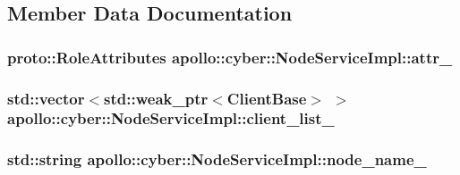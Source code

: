 \subsection{Member Data Documentation}
\hypertarget{classapollo_1_1cyber_1_1NodeServiceImpl_a762c2be3d310b7af1c0da1b83df54349}{
\subsubsection[{attr\-\_\-}]{\setlength{\rightskip}{0pt plus 5cm}proto\-::\-Role\-Attributes apollo\-::cyber\-::\-Node\-Service\-Impl\-::attr\-\_\-\hspace{0.3cm}{\ttfamily [private]}}}\label{classapollo_1_1cyber_1_1NodeServiceImpl_a762c2be3d310b7af1c0da1b83df54349}
\hypertarget{classapollo_1_1cyber_1_1NodeServiceImpl_a6b9e4bdf90743f8ae324ef1a44ed883f}{
\subsubsection[{client\-\_\-list\-\_\-}]{\setlength{\rightskip}{0pt plus 5cm}std\-::vector$<$std\-::weak\-\_\-ptr$<${\bf Client\-Base}$>$ $>$ apollo\-::cyber\-::\-Node\-Service\-Impl\-::client\-\_\-list\-\_\-\hspace{0.3cm}{\ttfamily [private]}}}\label{classapollo_1_1cyber_1_1NodeServiceImpl_a6b9e4bdf90743f8ae324ef1a44ed883f}
\hypertarget{classapollo_1_1cyber_1_1NodeServiceImpl_a8f9533d4f5e1f460bd8ee0e76644c912}{
\subsubsection[{node\-\_\-name\-\_\-}]{\setlength{\rightskip}{0pt plus 5cm}std\-::string apollo\-::cyber\-::\-Node\-Service\-Impl\-::node\-\_\-name\-\_\-\hspace{0.3cm}{\ttfamily [private]}}}\label{classapollo_1_1cyber_1_1NodeServiceImpl_a8f9533d4f5e1f460bd8ee0e76644c912}
